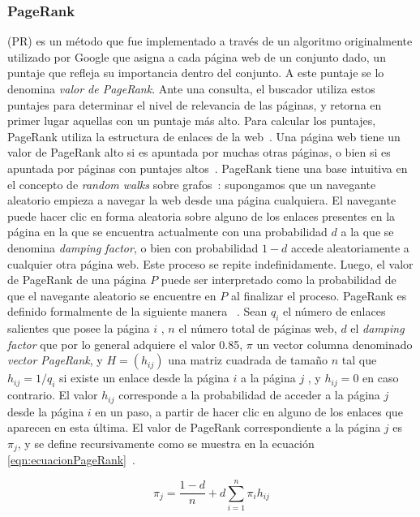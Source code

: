 \subsubsection{PageRank}
(PR) es un método que fue implementado a través de un algoritmo
originalmente utilizado por Google que asigna a cada página web de un conjunto dado, un puntaje que refleja su importancia dentro del conjunto. A este puntaje se lo denomina \textit{valor de PageRank}. Ante una consulta, el buscador utiliza estos puntajes para determinar el nivel de relevancia de las páginas, y retorna en primer lugar aquellas con un puntaje más alto. Para calcular los puntajes, PageRank utiliza la estructura de enlaces de la web~\cite{brin1998anatomy}. Una página web tiene un valor de PageRank alto si es apuntada por muchas otras páginas, o bien si es apuntada por páginas con puntajes altos~\cite{page1999pagerank}. PageRank tiene una base intuitiva en el concepto de \textit{random walks} sobre grafos~\cite{gobel1974random}: supongamos que un navegante aleatorio empieza a navegar la web desde una página cualquiera. El navegante puede hacer clic en forma aleatoria sobre alguno de los enlaces presentes en la página en la que se encuentra actualmente con una probabilidad $d$ a la que se denomina \textit{damping factor}, o bien con probabilidad $1-d$ accede aleatoriamente a cualquier otra página web. Este proceso se repite indefinidamente. Luego, el valor de PageRank de una página $P$ puede ser interpretado como la probabilidad de que el navegante aleatorio se encuentre en $P$ al finalizar el proceso. PageRank es definido formalmente de la siguiente manera ~\cite{franceschet2011pagerank}. Sean $q_i$ el número de enlaces salientes que posee la página $i$ , $n$ el número total de páginas web, $d$ el \textit{damping factor} que por lo general adquiere el valor 0.85, $\pi$ un vector columna denominado \textit{vector PageRank}, y $H = (h_{ij})$ una matriz cuadrada de tamaño $n$ tal que $h_{ij} = 1/q_i$ si existe un enlace desde la página $i$ a la página $j$ , y $h_{ij} = 0$ en caso contrario. El valor $h_{ij}$ corresponde a la probabilidad de acceder a la página $j$ desde la página $i$ en un paso, a partir de hacer clic en alguno de los enlaces que aparecen en esta última. El valor de PageRank correspondiente a la página $j$ es $\pi_j$, y se define recursivamente como se muestra en la ecuación \ref{eqn:ecuacionPageRank}~\cite{lin2010data}.

\begin{equation} 
	\label{eqn:ecuacionPageRank} 
	\pi_j = \frac{1-d}{n} + d \sum_{i=1}^{n} \pi_i h_{ij} 
\end{equation}
\vspace{-20pt}
